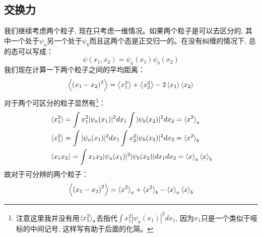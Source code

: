 \documentclass[a4paper,zihao=-4,linespread=1]{ctexrep}
\begin{document}
    \subsection{交换力}
    我们继续考虑两个粒子, 现在只考虑一维情况。如果两个粒子是可以去区分的, 其中一个处于$\psi_a$另一个处于$\psi_b$而且这两个态是正交归一的。在没有纠缠的情况下, 总的态可以写成：
    \[\psi(x_1,x_2)=\psi_a(x_1)\psi_b(x_2)\]
    我们现在计算一下两个粒子之间的平均距离：
    \[\Braket{\left(x_1-x_2\right)^2}=\Braket{x_1^2}+\Braket{x_2^2}-2\Braket{x_1}\Braket{x_2}\]
    对于两个可区分的粒子显然有\footnote{注意这里我并没有用$\braket{x_1^2}_a$去指代$\int x_1^2|\psi_a(x_1)|^2dx_1$, 因为$x_1$只是一个类似于哑标的中间记号, 这样写有助于后面的化简。}：
    \begin{align*}
        &\braket{x_1^2}=\int x_1^2|\psi_a(x_1)|^2dx_1\int |\psi_b(x_2)|^2dx_2=\braket{x^2}_a\\
        &\braket{x_1^2}=\int |\psi_a(x_1)|^2dx_1\int x_2^2 |\psi_b(x_2)|^2dx_2=\braket{x^2}_b\\
        &\braket{x_1x_2}=\int x_1x_2|\psi_a(x_1)|^2|\psi_b(x_2)|dx_1dx_2=\braket{x}_a\braket{x}_b
    \end{align*}
    故对于可分辨的两个粒子：
    \begin{equation}
        \label{eq:5.7}
        \Braket{\left(x_1-x_2\right)^2}=\braket{x^2}_a+\braket{x^2}_b-\braket{x}_a\braket{x}_b
    \end{equation}
    
\end{document}
